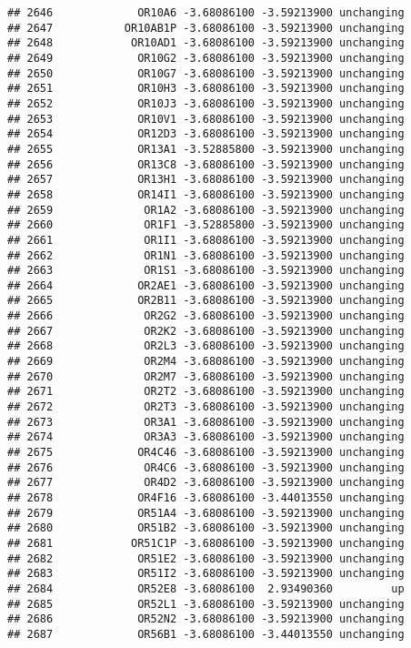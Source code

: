 \documentclass[]{article}
\begin{document}
\begin{verbatim}
## 2646             OR10A6 -3.68086100 -3.59213900 unchanging
## 2647           OR10AB1P -3.68086100 -3.59213900 unchanging
## 2648            OR10AD1 -3.68086100 -3.59213900 unchanging
## 2649             OR10G2 -3.68086100 -3.59213900 unchanging
## 2650             OR10G7 -3.68086100 -3.59213900 unchanging
## 2651             OR10H3 -3.68086100 -3.59213900 unchanging
## 2652             OR10J3 -3.68086100 -3.59213900 unchanging
## 2653             OR10V1 -3.68086100 -3.59213900 unchanging
## 2654             OR12D3 -3.68086100 -3.59213900 unchanging
## 2655             OR13A1 -3.52885800 -3.59213900 unchanging
## 2656             OR13C8 -3.68086100 -3.59213900 unchanging
## 2657             OR13H1 -3.68086100 -3.59213900 unchanging
## 2658             OR14I1 -3.68086100 -3.59213900 unchanging
## 2659              OR1A2 -3.68086100 -3.59213900 unchanging
## 2660              OR1F1 -3.52885800 -3.59213900 unchanging
## 2661              OR1I1 -3.68086100 -3.59213900 unchanging
## 2662              OR1N1 -3.68086100 -3.59213900 unchanging
## 2663              OR1S1 -3.68086100 -3.59213900 unchanging
## 2664             OR2AE1 -3.68086100 -3.59213900 unchanging
## 2665             OR2B11 -3.68086100 -3.59213900 unchanging
## 2666              OR2G2 -3.68086100 -3.59213900 unchanging
## 2667              OR2K2 -3.68086100 -3.59213900 unchanging
## 2668              OR2L3 -3.68086100 -3.59213900 unchanging
## 2669              OR2M4 -3.68086100 -3.59213900 unchanging
## 2670              OR2M7 -3.68086100 -3.59213900 unchanging
## 2671              OR2T2 -3.68086100 -3.59213900 unchanging
## 2672              OR2T3 -3.68086100 -3.59213900 unchanging
## 2673              OR3A1 -3.68086100 -3.59213900 unchanging
## 2674              OR3A3 -3.68086100 -3.59213900 unchanging
## 2675             OR4C46 -3.68086100 -3.59213900 unchanging
## 2676              OR4C6 -3.68086100 -3.59213900 unchanging
## 2677              OR4D2 -3.68086100 -3.59213900 unchanging
## 2678             OR4F16 -3.68086100 -3.44013550 unchanging
## 2679             OR51A4 -3.68086100 -3.59213900 unchanging
## 2680             OR51B2 -3.68086100 -3.59213900 unchanging
## 2681            OR51C1P -3.68086100 -3.59213900 unchanging
## 2682             OR51E2 -3.68086100 -3.59213900 unchanging
## 2683             OR51I2 -3.68086100 -3.59213900 unchanging
## 2684             OR52E8 -3.68086100  2.93490360         up
## 2685             OR52L1 -3.68086100 -3.59213900 unchanging
## 2686             OR52N2 -3.68086100 -3.59213900 unchanging
## 2687             OR56B1 -3.68086100 -3.44013550 unchanging

\end{verbatim}
\end{document}
